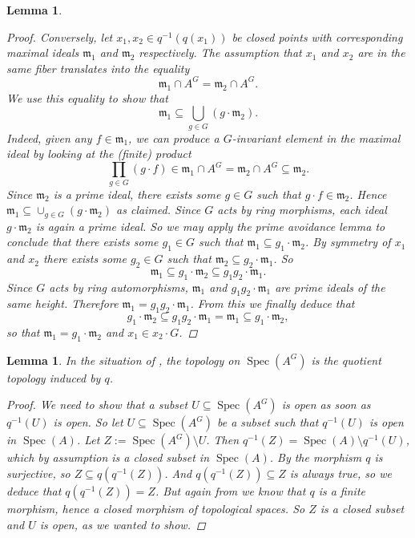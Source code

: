 \documentclass[12pt,a4paper]{amsart}
\theoremstyle{plain}
\newtheorem{lm}[thm]{Lemma}
\theoremstyle{definition}
\theoremstyle{remark}
\begin{document}
\begin{lm}
\begin{proof}
    Conversely, let $x_{1}, x_{2} \in q^{-1}(q(x_{1}))$ be closed points with corresponding maximal ideals $\mathfrak{m}_{1}$ and $\mathfrak{m}_{2}$ respectively.
    The assumption that $x_{1}$ and $x_{2}$ are in the same fiber translates into the equality
    \[ \mathfrak{m}_{1} \cap A^{G} = \mathfrak{m}_{2} \cap A^{G}. \]
    We use this equality to show that
    \[ \mathfrak{m}_{1} \subseteq \bigcup_{g \in G} (g \cdot \mathfrak{m}_{2}). \]
    Indeed, given any $f \in \mathfrak{m}_{1}$, we can produce a $G$-invariant element in the maximal ideal by looking at the (finite) product
    \[ \prod_{g \in G} (g \cdot f) \in \mathfrak{m}_{1} \cap A^{G} = \mathfrak{m}_{2} \cap A^{G} \subseteq \mathfrak{m}_{2}. \]
    Since $\mathfrak{m}_{2}$ is a prime ideal, there exists some $g \in G$ such that $g \cdot f \in \mathfrak{m}_{2}$.
    Hence $\mathfrak{m}_{1} \subseteq \cup_{g \in G} (g \cdot \mathfrak{m}_{2})$ as claimed.
    Since $G$ acts by ring morphisms, each ideal $g \cdot \mathfrak{m}_{2}$ is again a prime ideal.
    So we may apply the prime avoidance lemma to conclude that there exists some $g_{1} \in G$ such that $\mathfrak{m}_{1} \subseteq g_{1} \cdot \mathfrak{m}_{2}$.
    By symmetry of $x_{1}$ and $x_{2}$ there exists some $g_{2} \in G$ such that $\mathfrak{m}_{2} \subseteq g_{2} \cdot \mathfrak{m}_{1}$.
    So
    \[ \mathfrak{m}_{1} \subseteq g_{1} \cdot \mathfrak{m}_{2} \subseteq g_{1} g_{2} \cdot \mathfrak{m}_{1}. \]
    Since $G$ acts by ring automorphisms, $\mathfrak{m}_{1}$ and $g_{1} g_{2} \cdot \mathfrak{m}_{1}$ are prime ideals of the same height.
    Therefore $\mathfrak{m}_{1} = g_{1} g_{2} \cdot \mathfrak{m}_{1}$.
    From this we finally deduce that
    \[ g_{1} \cdot \mathfrak{m}_{2} \subseteq g_{1}g_{2} \cdot \mathfrak{m}_{1} = \mathfrak{m}_{1} \subseteq g_{1} \cdot \mathfrak{m}_{2}, \]
    so that $\mathfrak{m}_{1} = g_{1} \cdot \mathfrak{m}_{2}$ and $x_{1} \in x_{2} \cdot G$.
  \end{proof}
\end{lm}

\begin{lm}\label{lm:topology}
  In the situation of , the topology on $\operatorname{Spec}(A^{G})$ is the quotient topology induced by $q$.
  
  \begin{proof}
    We need to show that a subset $U \subseteq \operatorname{Spec}(A^{G})$ is open as soon as $q^{-1}(U)$ is open.
    So let $U \subseteq \operatorname{Spec}(A^{G})$ be a subset such that $q^{-1}(U)$ is open in $\operatorname{Spec}(A)$.
    Let $Z := \operatorname{Spec}(A^{G}) \setminus U$.
    Then $q^{-1}(Z) = \operatorname{Spec}(A) \setminus q^{-1}(U)$, which by assumption is a closed subset in $\operatorname{Spec}(A)$.
    By  the morphism $q$ is surjective, so $Z \subseteq q(q^{-1}(Z))$.
    And $q(q^{-1}(Z)) \subseteq Z$ is always true, so we deduce that $q(q^{-1}(Z)) = Z$.
    But again from  we know that $q$ is a finite morphism, hence a closed morphism of topological spaces.
    So $Z$ is a closed subset and $U$ is open, as we wanted to show.
  \end{proof}
\end{lm}
\end{document}
